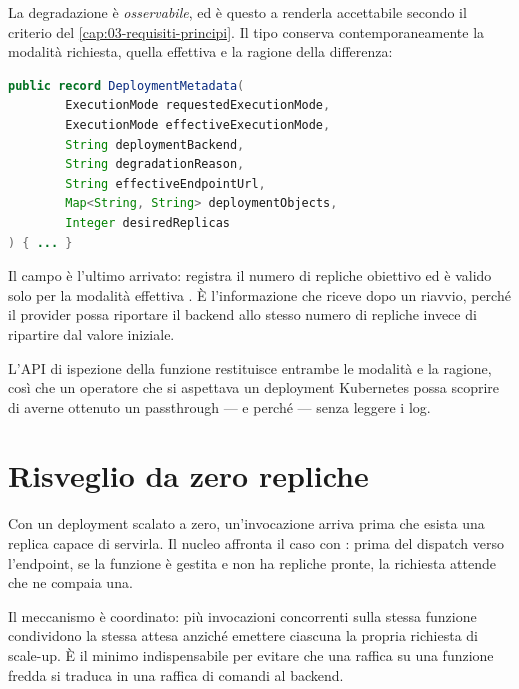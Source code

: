 La degradazione \`e \emph{osservabile}, ed \`e questo a renderla accettabile
secondo il criterio del \cref{cap:03-requisiti-principi}. Il tipo
 conserva contemporaneamente la modalit\`a richiesta,
quella effettiva e la ragione della differenza:

\begin{lstlisting}[language=Java]
public record DeploymentMetadata(
        ExecutionMode requestedExecutionMode,
        ExecutionMode effectiveExecutionMode,
        String deploymentBackend,
        String degradationReason,
        String effectiveEndpointUrl,
        Map<String, String> deploymentObjects,
        Integer desiredReplicas
) { ... }
\end{lstlisting}

Il campo  \`e l'ultimo arrivato: registra il numero di
repliche obiettivo ed \`e valido solo per la modalit\`a effettiva
. \`E l'informazione che  riceve dopo un
riavvio, perch\'e il provider possa riportare il backend allo stesso numero di
repliche invece di ripartire dal valore iniziale.

L'API di ispezione della funzione restituisce entrambe le modalit\`a e la
ragione, cos\`i che un operatore che si aspettava un deployment Kubernetes possa
scoprire di averne ottenuto un passthrough --- e perch\'e --- senza leggere i
log.

\section{Risveglio da zero repliche}

Con un deployment scalato a zero, un'invocazione arriva prima che esista una
replica capace di servirla. Il nucleo affronta il caso con
: prima del dispatch verso l'endpoint, se la funzione
\`e gestita e non ha repliche pronte, la richiesta attende che ne compaia una.

Il meccanismo \`e coordinato: pi\`u invocazioni concorrenti sulla stessa funzione
condividono la stessa attesa anzich\'e emettere ciascuna la propria richiesta di
scale-up. \`E il minimo indispensabile per evitare che una raffica su una
funzione fredda si traduca in una raffica di comandi al backend.


